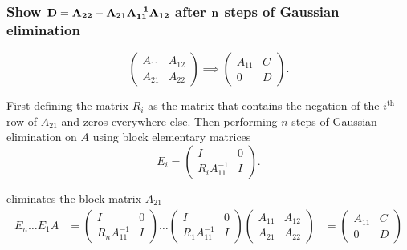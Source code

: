 \subsubsection{Show ${\bf D =A_{22}-A_{21}A_{11}^{-1}A_{12}}$ after ${\bf n}$
steps of Gaussian elimination }%
\label{ssub:part_b}

\[
\begin{pmatrix}
  A_{11} & A_{12} \\ A_{21} & A_{22}    
\end{pmatrix} \implies  \begin{pmatrix}
  A_{11} & C \\
  0 & D
\end{pmatrix}
.\] 


    First defining the matrix $R_{i}$ as the matrix that contains the negation
    of the $i^{\text{th}}$ row of $A_{21}$ and zeros everywhere else. Then
    performing $n$ steps of Gaussian elimination on $A$ using block elementary
    matrices
    \[
    E_{i} = \begin{pmatrix}
      I & 0 \\
      R_{i}A_{11}^{-1} & I
    \end{pmatrix}
    .\] 

    eliminates the block matrix $A_{21}$ 
    \begin{align*}
      E_{n} \dots E_1 A &= \begin{pmatrix}
        I & 0 \\
        R_{n}A_{11}^{-1} & I
      \end{pmatrix} \dots \begin{pmatrix}
        I & 0 \\
        R_{1}A_{11}^{-1} & I
      \end{pmatrix} \begin{pmatrix}
        A_{11} & A_{12} \\
        A_{21} & A_{22}
      \end{pmatrix}
                        &= \begin{pmatrix}
                          A_{11} & C \\
                          0 & D
                        \end{pmatrix}
    \end{align*}

